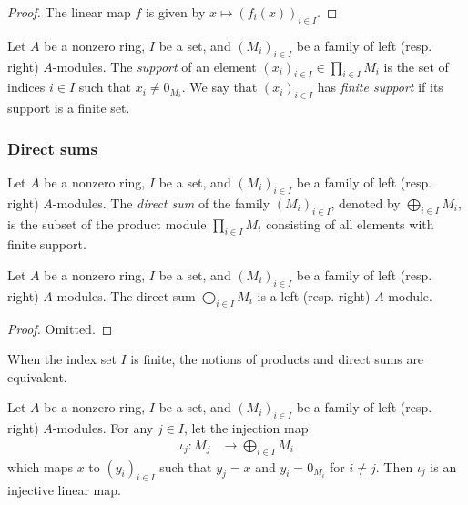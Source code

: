\documentclass[12pt]{report}
\begin{document}
\begin{proof}
    The linear map $f$ is given by $x \mapsto (f_i(x))_{i \in I}$.
\end{proof}

\begin{definition} \label{def-module-product-finite-support}
    Let $A$ be a nonzero ring, $I$ be a set, and $(M_i)_{i \in I}$ be a family of left (resp. right) $A$-modules. 
    The \emph{support} of an element $(x_i)_{i \in I} \in \prod_{i \in I} M_i$ is the set of indices $i \in I$ such that $x_i \neq 0_{M_i}$. 
    We say that $(x_i)_{i \in I}$ has \emph{finite support} if its support is a finite set.
\end{definition}

\subsubsection{Direct sums}

\begin{definition} \label{def-module-direct-sum}
    Let $A$ be a nonzero ring, $I$ be a set, and $(M_i)_{i \in I}$ be a family of left (resp. right) $A$-modules. 
    The \emph{direct sum} of the family $(M_i)_{i \in I}$, denoted by $\bigoplus\limits_{i \in I} M_i$, is the subset of the product module $\prod\limits_{i \in I} M_i$ consisting of all elements with finite support.
\end{definition}

\begin{proposition} \label{prop-module-direct-sum-submodule}
    Let $A$ be a nonzero ring, $I$ be a set, and $(M_i)_{i \in I}$ be a family of left (resp. right) $A$-modules. The direct sum $\bigoplus\limits_{i \in I} M_i$ is a left (resp. right) $A$-module.
\end{proposition}

\begin{proof}
    Omitted.
\end{proof}

\begin{remark}
    When the index set $I$ is finite, the notions of products and direct sums are equivalent.
\end{remark}

\begin{proposition}
    Let $A$ be a nonzero ring, $I$ be a set, and $(M_i)_{i \in I}$ be a family of left (resp. right) $A$-modules. For any $j \in I$, let the injection map
    \[
        \begin{aligned}
            \iota_j \colon M_j &\longrightarrow \bigoplus\limits_{i \in I} M_i
        \end{aligned}
    \]
    which maps $x$ to $(y_i)_{i \in I}$ such that $y_j = x$ and $y_i = 0_{M_i}$ for $i \neq j$. Then $\iota_j$ is an injective linear map.
\end{proposition}
\end{document}
